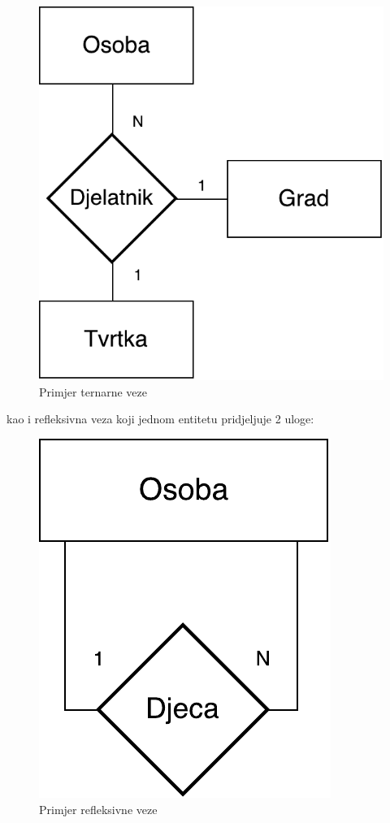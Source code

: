 \documentclass[times, utf8, zavrsni]{fer}
\begin{document}
\begin{figure}[H]
\centering
\includegraphics[scale=0.8]{img/veza-3.pdf}
\caption{Primjer ternarne veze}
\label{fig:veza-3}
\end{figure}

kao i refleksivna veza koji jednom entitetu pridjeljuje 2 uloge:\\

\begin{figure}[H]
\centering
\includegraphics[scale=0.8]{img/veza-ref.pdf}
\caption{Primjer refleksivne veze}
\label{fig:veza-ref}
\end{figure}
\end{document}
